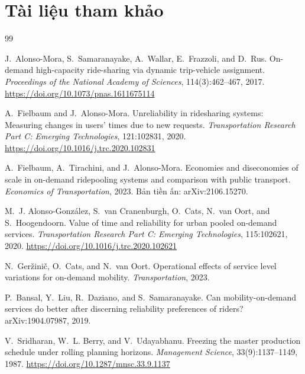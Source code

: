 \chapter*{Tài liệu tham khảo}

\begin{thebibliography}{99}
\setlength{\itemsep}{5pt}

J.~Alonso-Mora, S.~Samaranayake, A.~Wallar, E.~Frazzoli, and D.~Rus.
\newblock On-demand high-capacity ride-sharing via dynamic trip-vehicle assignment.
\newblock \emph{Proceedings of the National Academy of Sciences}, 114(3):462--467, 2017.
\newblock \url{https://doi.org/10.1073/pnas.1611675114}

A.~Fielbaum and J.~Alonso-Mora.
\newblock Unreliability in ridesharing systems: Measuring changes in users' times due to new
requests.
\newblock \emph{Transportation Research Part C: Emerging Technologies}, 121:102831, 2020.
\newblock \url{https://doi.org/10.1016/j.trc.2020.102831}

A.~Fielbaum, A.~Tirachini, and J.~Alonso-Mora.
\newblock Economies and diseconomies of scale in on-demand ridepooling systems and comparison
with public transport.
\newblock \emph{Economics of Transportation}, 2023. Bản tiền ấn: arXiv:2106.15270.

M.~J. Alonso-González, S.~van Cranenburgh, O.~Cats, N.~van Oort, and S.~Hoogendoorn.
\newblock Value of time and reliability for urban pooled on-demand services.
\newblock \emph{Transportation Research Part C: Emerging Technologies}, 115:102621, 2020.
\newblock \url{https://doi.org/10.1016/j.trc.2020.102621}

N.~Geržinič, O.~Cats, and N.~van Oort.
\newblock Operational effects of service level variations for on-demand mobility.
\newblock \emph{Transportation}, 2023.

P.~Bansal, Y.~Liu, R.~Daziano, and S.~Samaranayake.
\newblock Can mobility-on-demand services do better after discerning reliability preferences of
riders?
\newblock arXiv:1904.07987, 2019.

V.~Sridharan, W.~L. Berry, and V.~Udayabhanu.
\newblock Freezing the master production schedule under rolling planning horizons.
\newblock \emph{Management Science}, 33(9):1137--1149, 1987.
\newblock \url{https://doi.org/10.1287/mnsc.33.9.1137}


\end{thebibliography}
